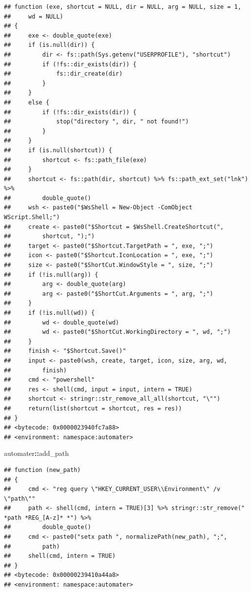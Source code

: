 \documentclass[
]{article}
\newenvironment{Shaded}{\begin{snugshade}}{\end{snugshade}}
\newcommand{\NormalTok}[1]{#1}
\newcommand{\SpecialCharTok}[1]{\textcolor[rgb]{0.81,0.36,0.00}{\textbf{#1}}}
\begin{document}
\begin{verbatim}
## function (exe, shortcut = NULL, dir = NULL, arg = NULL, size = 1, 
##     wd = NULL) 
## {
##     exe <- double_quote(exe)
##     if (is.null(dir)) {
##         dir <- fs::path(Sys.getenv("USERPROFILE"), "shortcut")
##         if (!fs::dir_exists(dir)) {
##             fs::dir_create(dir)
##         }
##     }
##     else {
##         if (!fs::dir_exists(dir)) {
##             stop("directory ", dir, " not found!")
##         }
##     }
##     if (is.null(shortcut)) {
##         shortcut <- fs::path_file(exe)
##     }
##     shortcut <- fs::path(dir, shortcut) %>% fs::path_ext_set("lnk") %>% 
##         double_quote()
##     wsh <- paste0("$WsShell = New-Object -ComObject WScript.Shell;")
##     create <- paste0("$Shortcut = $WsShell.CreateShortcut(", 
##         shortcut, ");")
##     target <- paste0("$Shortcut.TargetPath = ", exe, ";")
##     icon <- paste0("$Shortcut.IconLocation = ", exe, ";")
##     size <- paste0("$ShortCut.WindowStyle = ", size, ";")
##     if (!is.null(arg)) {
##         arg <- double_quote(arg)
##         arg <- paste0("$ShortCut.Arguments = ", arg, ";")
##     }
##     if (!is.null(wd)) {
##         wd <- double_quote(wd)
##         wd <- paste0("$ShortCut.WorkingDirectory = ", wd, ";")
##     }
##     finish <- "$Shortcut.Save()"
##     input <- paste0(wsh, create, target, icon, size, arg, wd, 
##         finish)
##     cmd <- "powershell"
##     res <- shell(cmd, input = input, intern = TRUE)
##     shortcut <- stringr::str_remove_all_all(shortcut, "\"")
##     return(list(shortcut = shortcut, res = res))
## }
## <bytecode: 0x0000023940fc7a88>
## <environment: namespace:automater>
\end{verbatim}

\begin{Shaded}
\begin{Highlighting}[]
\NormalTok{automater}\SpecialCharTok{::}\NormalTok{add\_path}
\end{Highlighting}
\end{Shaded}

\begin{verbatim}
## function (new_path) 
## {
##     cmd <- "reg query \"HKEY_CURRENT_USER\\Environment\" /v \"path\""
##     path <- shell(cmd, intern = TRUE)[3] %>% stringr::str_remove(" *path *REG_[A-z]* *") %>% 
##         double_quote()
##     cmd <- paste0("setx path ", normalizePath(new_path), ";", 
##         path)
##     shell(cmd, intern = TRUE)
## }
## <bytecode: 0x00000239410a44a8>
## <environment: namespace:automater>
\end{verbatim}
\end{document}
